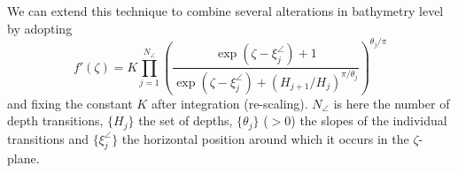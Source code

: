 \documentclass[internal]{sintefmemo}
\newcommand{\mr}{\mathrm}
\newcommand{\ii}{\mr{i}\,}
\renewcommand{\_}[1]{_\mr{#1}}
\newcommand{\rbr}[1]{\left(#1\right)}
\newcommand{\z}{z}
\newcommand{\zz}{\zeta}
\newcommand{\xx}{\xi}
\newcommand{\yy}{\sigma}
\newcommand{\zmap}{f}
\begin{document}
We can extend this technique to combine several alterations in bathymetry level by adopting
\begin{equation}
\zmap'(\zz) = K \prod_{j=1}^{N_\angle} \rbr{\frac{\exp(\zz-\xi^\angle_j)+1}{\exp(\zz-\xx^\angle_j) + (H_{j+1}/H_j)^{\pi/\theta_j}}}^{\theta_j/\pi}
\label{eq:SCnumMultiStep}
\end{equation}
and fixing the constant $K$ after integration (re-scaling). $N_\angle$ is here the number of depth transitions, $\{H_j\}$ the set of depths, $\{\theta_j\}$ ($>0$) the slopes of the individual transitions and $\{\xi^\angle_j\}$ the horizontal position around which it occurs in the $\zz$-plane. 
%
%
%
\end{document}
